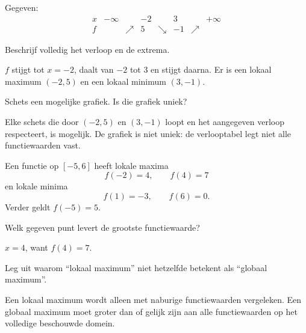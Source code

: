 \documentclass{ximera}
\begin{document}
\begin{oefening}{\oefU\ESS}

  Gegeven:
\[
\begin{array}{c|ccccccc}
x&-\infty&&-2&&3&&+\infty\\ \hline
f&&\nearrow&5&\searrow&-1&\nearrow&
\end{array}
\]

\begin{question}
Beschrijf volledig het verloop en de extrema.
\begin{oplossing}
\(f\) stijgt tot \(x=-2\), daalt van \(-2\) tot \(3\) en stijgt daarna.
Er is een lokaal maximum \((-2,5)\) en een lokaal minimum \((3,-1)\).
\end{oplossing}
\end{question}

\begin{question}
Schets een mogelijke grafiek. Is die grafiek uniek?
\begin{oplossing}
Elke schets die door \((-2,5)\) en \((3,-1)\) loopt en het aangegeven
verloop respecteert, is mogelijk. De grafiek is niet uniek: de verlooptabel
legt niet alle functiewaarden vast.
\end{oplossing}
\end{question}
\end{oefening}

\begin{oefening}{\oefU\ESS}

Een functie op \([-5,6]\) heeft lokale maxima
\[
f(-2)=4,\qquad f(4)=7
\]
en lokale minima
\[
f(1)=-3,\qquad f(6)=0.
\]
Verder geldt \(f(-5)=5\).

\begin{question}
Welk gegeven punt levert de grootste functiewaarde?
\begin{oplossing}
\(x=4\), want \(f(4)=7\).
\end{oplossing}
\end{question}

\begin{question}
Leg uit waarom ``lokaal maximum'' niet hetzelfde betekent als ``globaal maximum''.
\begin{oplossing}
Een lokaal maximum wordt alleen met naburige functiewaarden vergeleken.
Een globaal maximum moet groter dan of gelijk zijn aan alle functiewaarden
op het volledige beschouwde domein.
\end{oplossing}
\end{question}
\end{oefening}
\end{document}
